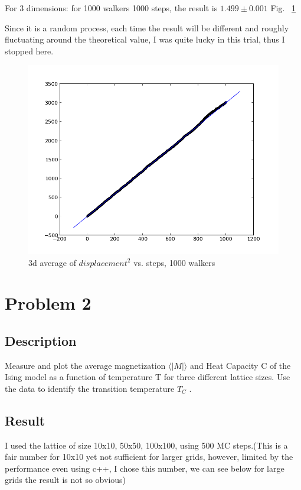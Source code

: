 \documentclass[11pt,letterpaper]{article}
\begin{document}
For 3 dimensions: for 1000 walkers 1000 steps, the result is $1.499 \pm 0.001$ Fig. ~\ref{figure3}

Since it is a random process, each time the result will be different and roughly fluctuating around the theoretical value, I was quite lucky in this trial, thus I stopped here.
\begin{figure}
\begin{center}
\includegraphics[width=0.8\linewidth,angle=0]{p13.png}
\caption{3d average of $displacement^2$ vs. steps, 1000 walkers}
\label{figure3}
\end{center}
\end{figure}






\newpage

\section{Problem 2}

\subsection{Description}
Measure and plot the average magnetization $\big \langle |M| \big \rangle$  and Heat Capacity C  of the Ising model as a function of temperature  T for three different lattice sizes. Use the data to identify the transition temperature $T_C$ .

\subsection{Result}

I used the lattice of size 10x10, 50x50, 100x100, using 500 MC steps.(This is a fair number for 10x10 yet not sufficient for larger grids, however, limited by the performance even using c++, I chose this number, we can see below for large grids the result is not so obvious)
\end{document}
